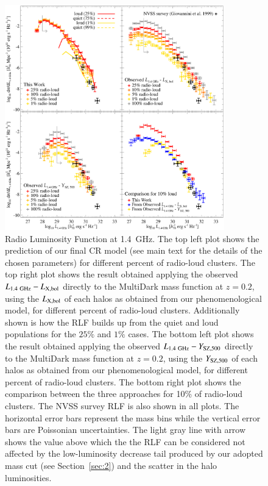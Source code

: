 \documentclass[traditabstract]{aa}
\newcommand{\rmn}{\mathrm}
\begin{document}
\begin{figure}[hbt!]
\centering
\includegraphics[width=0.85\textwidth]{figures/RLFs_1.4.eps}
\caption{Radio Luminosity Function at 1.4~GHz. The top left plot shows the prediction of our final CR model (see main text for the details of the chosen parameters) for different percent of radio-loud clusters. The top right plot shows the result obtained applying the observed $L_{1.4~\rmn{GHz}}-L_{\rm{X,bol}}$ directly to the MultiDark mass function at  $z = 0.2$, using the $L_{\rm{X,bol}}$ of each halos as obtained from our phenomenological model, for different percent of radio-loud clusters. Additionally shown is how the RLF builds up from the quiet and loud populations for the $25\%$ and $1\%$ cases. The bottom left plot shows the result obtained applying the observed $L_{1.4~\rmn{GHz}}-Y_{\rm{SZ}, 500}$ directly to the MultiDark mass function at  $z = 0.2$,  using the $Y_{\rm{SZ}, 500}$ of each halos as obtained from our phenomenological model, for different percent of radio-loud clusters. The bottom right plot shows the comparison between the three approaches for 10\% of radio-loud clusters. The NVSS survey RLF \citep{1999NewA....4..141G} is also shown in all plots. The horizontal error bars represent the mass bins while the vertical error bars are Poissonian uncertainties. The light gray line with arrow shows the value above which the the RLF can be considered not affected by the low-luminosity decrease tail produced by our adopted mass cut (see Section~\ref{sec:2}) and the scatter in the halo luminosities.}
\label{fig:RLF_1.4}
\end{figure}
\end{document}
